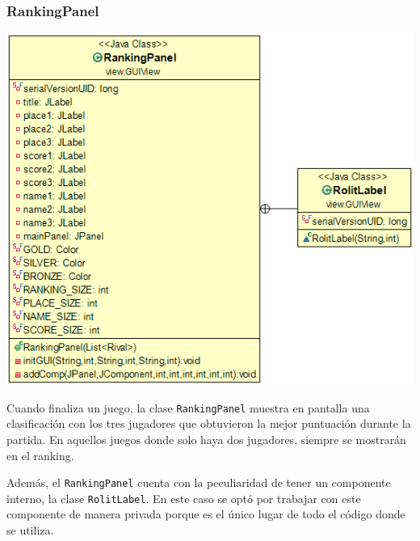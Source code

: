 \documentclass[../DocumentoOficial.tex]{subfiles}
\begin{document}
\subsubsection{RankingPanel}

\begin{center}
\includegraphics[scale=0.55]{rankingpanel.png}
\end{center}

Cuando finaliza un juego, la clase \texttt{RankingPanel} muestra en pantalla una clasificación con los tres jugadores que obtuvieron la mejor puntuación durante la partida. En aquellos juegos donde solo haya dos jugadores, siempre se mostrarán en el ranking.

Además, el \texttt{RankingPanel} cuenta con la peculiaridad de tener un componente interno, la clase \texttt{RolitLabel}. En este caso se optó por trabajar con este componente de manera privada porque es el único lugar de todo el código donde se utiliza.
\end{document}
